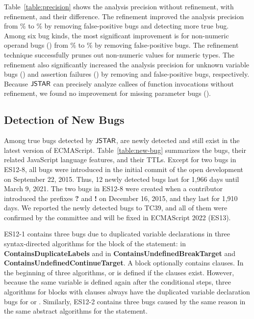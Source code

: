 Table~\ref{table:precision} shows the analysis precision without refinement,
with refinement, and their difference.  The refinement improved the analysis
precision from \% to \% by removing 
false-positive bugs and detecting  more true bug.  Among six
bug kinds, the most significant improvement is for non-numeric
operand bugs () from \% to \%
by removing  false-positive bugs.  The refinement technique
successfully prunes out non-numeric values for numeric types.
The refinement also significantly increased the analysis precision for unknown
variable bugs () and assertion failures
() by removing  and  false-positive bugs, respectively.
Because $\tool$ can precisely analyze callees of function invocations
without refinement, we found no improvement for missing
parameter bugs ().


\subsection{Detection of New Bugs}\label{sec:new-bug}

Among  true bugs detected by $\tool$,  are newly
detected and still exist in the latest version of ECMAScript.
Table~\ref{table:new-bug} summarizes the bugs, their
related JavaScript language features, and their TTLs.
Except for two bugs in ES12-8, all bugs were introduced in the initial
commit of the open development on September 22, 2015.
Thus, 12 newly detected bugs last for 1,966 days until March 9, 2021.
The two bugs in ES12-8 were created when a contributor introduced
the prefixes \textbf{?} and \textbf{!} on December 16, 2015, and they last for 1,910 days.
We reported the newly detected bugs to TC39, and all of them were
confirmed by the committee and will be fixed in ECMAScript 2022 (ES13).

ES12-1 contains three bugs due to duplicated variable declarations
in three syntax-directed algorithms for the  block
of the  statement:
 in \textbf{ContainsDuplicateLabels} and
 in \textbf{ContainsUndefinedBreakTarget} and
\textbf{ContainsUndefinedContinueTarget}.
A  block optionally contains  clauses.
In the beginning of three algorithms,
 or  is defined if the clauses exist.
However, because the same variable is defined again after the conditional steps,
three algorithms for  blocks
with  clauses always have the duplicated variable declaration bugs for
 or .
Similarly, ES12-2 contains three bugs caused by the same reason in the
same abstract algorithms for the  statement.

